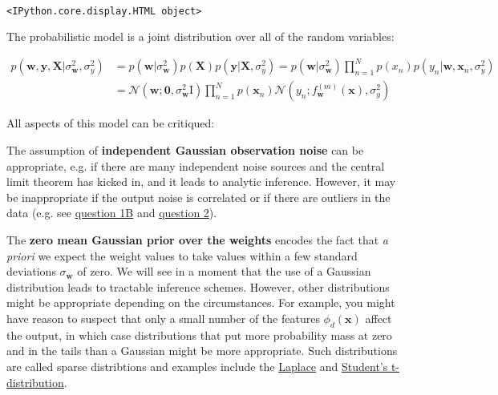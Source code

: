 \documentclass[11pt]{article}
\begin{document}
    \begin{center}
    \end{center}
    { \hspace*{\fill} \\}
    
    
    \begin{verbatim}
<IPython.core.display.HTML object>
    \end{verbatim}

    
    The probabilistic model is a joint distribution over all of the random
variables:

\begin{align}
p(\mathbf{w},\mathbf{y},\mathbf{X} | \sigma_{\mathbf{w}}^2,\sigma_{y}^2) & = p(\mathbf{w}| \sigma_{\mathbf{w}}^2)  p(\mathbf{X}) p(\mathbf{y}|\mathbf{X},\sigma_{y}^2) = p(\mathbf{w} | \sigma_{\mathbf{w}}^2) \prod_{n=1}^N p(x_n) p(y_n |\mathbf{w},\mathbf{x}_n,\sigma_{y}^2)\\
& = \mathcal{N}(\mathbf{w} ; \mathbf{0},\sigma_{\mathbf{w}}^2 \mathrm{I}) \prod_{n=1}^N p(\mathbf{x}_n) \mathcal{N}(y_n; f^{(m)}_{\mathbf{w}}(\mathbf{x}),\sigma_{y}^2)
\end{align}

All aspects of this model can be critiqued:

The assumption of \textbf{independent Gaussian observation noise} can be
appropriate, e.g. if there are many independent noise sources and the
central limit theorem has kicked in, and it leads to analytic inference.
However, it may be inappropriate if the output noise is correlated or if
there are outliers in the data (e.g. see
\href{regression_linear.ipynb}{question 1B} and
\href{regression_regularisation.ipynb}{question 2}).

The \textbf{zero mean Gaussian prior over the weights} encodes the fact
that \emph{a priori} we expect the weight values to take values within a
few standard deviations \(\sigma_{\mathbf{w}}\) of zero. We will see in
a moment that the use of a Gaussian distribution leads to tractable
inference schemes. However, other distributions might be appropriate
depending on the circumstances. For example, you might have reason to
suspect that only a small number of the features \(\phi_d(\mathbf{x})\)
affect the output, in which case distributions that put more probability
mass at zero and in the tails than a Gaussian might be more appropriate.
Such distributions are called sparse distribtions and examples include
the \href{https://en.wikipedia.org/wiki/Laplace_distribution}{Laplace}
and
\href{https://en.wikipedia.org/wiki/Student\%27s_t-distribution}{Student's
t-distribution}.
\end{document}
